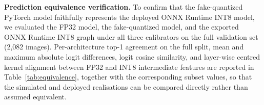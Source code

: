 \documentclass[fleqn,10pt]{wlscirep}
\begin{document}
\textbf{Prediction equivalence verification.} To confirm that the fake-quantized PyTorch model faithfully represents the deployed ONNX Runtime INT8 model, we evaluated the FP32 model, the fake-quantized model, and the exported ONNX Runtime INT8 graph under all three calibrators on the full validation set (2{,}082 images). Per-architecture top-1 agreement on the full split, mean and maximum absolute logit differences, logit cosine similarity, and layer-wise centred kernel alignment between FP32 and INT8 intermediate features are reported in Table~\ref{tab:equivalence}, together with the corresponding subset values, so that the simulated and deployed realisations can be compared directly rather than assumed equivalent.


\end{document}
